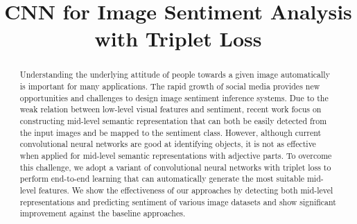 \documentclass[a4paper,conference]{IEEEtran}
\begin{document}
%
\title{CNN for Image Sentiment Analysis\\ with Triplet Loss}


\author{
}

\maketitle

\begin{abstract}
Understanding the underlying attitude of people towards a given image automatically is important for many applications. The rapid growth of social media provides new opportunities and challenges to design image sentiment inference systems. Due to the weak relation between low-level visual features and sentiment, recent work focus on constructing mid-level semantic representation that can both be easily detected from the input images and be mapped to the sentiment class. However, although current convolutional neural networks are good at identifying objects, it is not as effective when applied for mid-level semantic representations with adjective parts. To overcome this challenge, we adopt a variant of convolutional neural networks with triplet loss to perform end-to-end learning that can automatically generate the most suitable mid-level features. We show the effectiveness of our approaches by detecting both mid-level representations and predicting sentiment of various image datasets and show significant improvement against the baseline approaches.
\end{abstract}

\IEEEpeerreviewmaketitle










\clearpage





\end{document}
